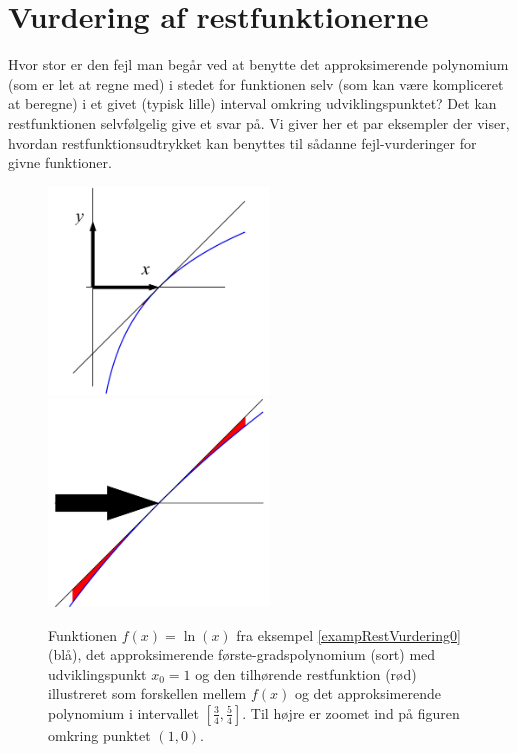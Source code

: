 \section{Vurdering af restfunktionerne} \label{secVurderingRest}

Hvor stor er den fejl man begår ved at benytte det approksimerende polynomium (som er let at regne med) i stedet for funktionen selv (som kan være kompliceret at beregne) i et givet (typisk lille) interval omkring udviklingspunktet? Det kan restfunktionen selvfølgelig give et svar på. Vi giver her et par eksempler der viser, hvordan restfunktions\-udtrykket kan benyttes til sådanne fejl-vurderinger for givne funktioner.


\begin{figure}[ht]
\centerline{ \includegraphics[height=55mm]{plotLn.pdf} \includegraphics[height=55mm]{plotLnZoom.pdf}}
\begin{center}
\caption{Funktionen $f(x) = \ln(x)$ fra eksempel \ref{exampRestVurdering0} (blå), det approksimerende første-gradspolynomium (sort) med udviklingspunkt $x_{0}=1$ og den tilhørende restfunktion (rød) illustreret som forskellen mellem $f(x)$ og det approksimerende polynomium i intervallet $\left[\frac{3}{4}, \frac{5}{4}\right]$. Til højre er zoomet ind på figuren omkring punktet $(1,0)$.} \label{figLn}
\end{center}
\end{figure}

